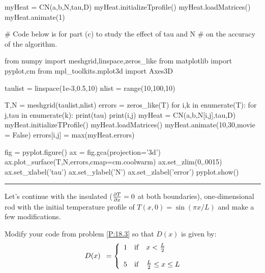 {\begin{codeexample}
\begin{VerbatimOut}{\listingFile}
myHeat = CN(a,b,N,tau,D)
myHeat.initializeTprofile()
myHeat.loadMatrices()
myHeat.animate(1)

# Code below is for part (c) to study the effect of tau and N 
# on the accuracy of the algorithm.

from numpy import meshgrid,linspace,zeros_like
from matplotlib import pyplot,cm
from mpl_toolkits.mplot3d import Axes3D

taulist = linspace(1e-3,0.5,10)
nlist = range(10,100,10)

T,N = meshgrid(taulist,nlist)
errors = zeros_like(T)
for i,k in enumerate(T):
    for j,tau in enumerate(k):
        print(tau)
        print(i,j)
        myHeat = CN(a,b,N[i,j],tau,D)
        myHeat.initializeTProfile()
        myHeat.loadMatrices()
        myHeat.animate(10,30,movie = False)
        errors[i,j] = max(myHeat.errors)

fig = pyplot.figure()
ax = fig.gca(projection='3d')
ax.plot_surface(T,N,errors,cmap=cm.coolwarm)
ax.set_zlim(0,.0015)
ax.set_xlabel('tau')
ax.set_ylabel('N')
ax.set_zlabel('error')
pyplot.show()

\end{VerbatimOut}
\end{codeexample}
\else
\noindent\rule{5 in}{0.01 in}
\fi


\begin{enumerate}
  \prob \label{P:18.4} Let's continue with the insulated (${\partial T
    \over \partial x} = 0$ at both boundaries), one-dimensional rod
  with the initial temperature profile of $T(x,0) = \sin(\pi x/L)$ and
  make a few modifications.
\begin{enumerate}
\subprob \label{P:18.4a} Modify your code from problem \ref{P:18.3} so
that  $D(x)$ is given by:
    \begin{equation}
    \begin{array}{c}
     \\
    D(x) \\
     \\
    \end{array}
    =
    \left\{
    \begin{array}{ll}
    1 & {\rm if~~~} x < {L \over 2} \\
     & \\
    5 & {\rm if~~~} {L \over 2} \le x \le L \\
    \end{array}
    \right.
    \end{equation}


\end{enumerate}
\end{enumerate}}
